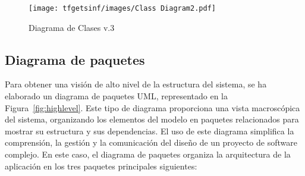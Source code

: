 \begin{figure}[H]
    \centering
    \texttt{[image: tfgetsinf/images/Class Diagram2.pdf]}
    \caption{Diagrama de Clases v.3}
    \label{fig:clases3}
\end{figure}

\subsection{Diagrama de paquetes}

Para obtener una visión de alto nivel de la estructura del sistema, se ha elaborado un diagrama de paquetes UML, representado en la Figura~\ref{fig:highlevel}. Este tipo de diagrama proporciona una vista macroscópica del sistema, organizando los elementos del modelo en paquetes relacionados para mostrar su estructura y sus dependencias. El uso de este diagrama simplifica la comprensión, la gestión y la comunicación del diseño de un proyecto de software complejo.
En este caso, el diagrama de paquetes organiza la arquitectura de la aplicación en los tres paquetes principales siguientes:

